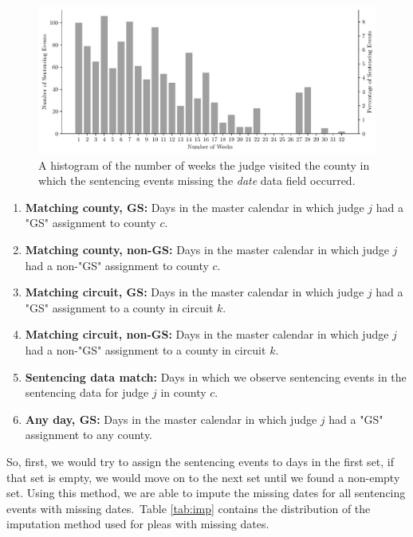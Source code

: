 \documentclass[11pt, oneside]{article}   	%
\theoremstyle{ModifiedStyle}
\begin{document}
			\begin{figure}[H]
				\centering
				\includegraphics[scale=0.75]{Figures/Missing_Date_Histogram_of_Potential_Week_Histogram}
				\vspace{-2mm}
				\caption{A histogram of the number of weeks the judge visited the county in which the sentencing events missing the \emph{date} data field occurred.}
				\label{Figure_Missing_Date_Histogram_of_Potential_Week_Histogram}
			\end{figure}

      \begin{enumerate}
        \item \textbf{Matching county, GS:} Days in the master calendar in which judge $j$ had a "GS" assignment to county $c$.
        \item \textbf{Matching county, non-GS:} Days in the master calendar in which judge $j$ had a non-"GS" assignment to county $c$.
        \item \textbf{Matching circuit, GS:} Days in the master calendar in which judge $j$ had a "GS" assignment to a county in circuit $k$.
        \item \textbf{Matching circuit, non-GS:} Days in the master calendar in which judge $j$ had a non-"GS" assignment to a county in circuit $k$.
        \item \textbf{Sentencing data match:} Days in which we observe sentencing events in the sentencing data for judge $j$ in county $c$.
        \item \textbf{Any day, GS:} Days in the master calendar in which judge $j$ had a "GS" assignment to any county.
      \end{enumerate}

      So, first, we would try to assign the sentencing events to days in the first set, if that set is empty, we would move on to the next set until we found a non-empty set. Using this method, we are able to impute the missing dates for all sentencing events with missing dates. Table \ref{tab:imp} contains the distribution of the imputation method used for pleas with missing dates.
\end{document}
